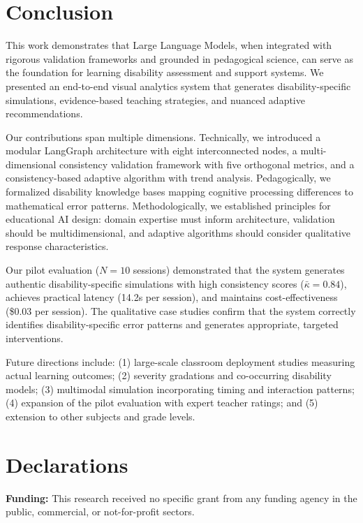 \documentclass[11pt]{article}
\begin{document}
\section{Conclusion}\label{sec:conclusion}

This work demonstrates that Large Language Models, when integrated with rigorous validation frameworks and grounded in pedagogical science, can serve as the foundation for learning disability assessment and support systems. We presented an end-to-end visual analytics system that generates disability-specific simulations, evidence-based teaching strategies, and nuanced adaptive recommendations.

Our contributions span multiple dimensions. Technically, we introduced a modular LangGraph architecture with eight interconnected nodes, a multi-dimensional consistency validation framework with five orthogonal metrics, and a consistency-based adaptive algorithm with trend analysis. Pedagogically, we formalized disability knowledge bases mapping cognitive processing differences to mathematical error patterns. Methodologically, we established principles for educational AI design: domain expertise must inform architecture, validation should be multidimensional, and adaptive algorithms should consider qualitative response characteristics.

Our pilot evaluation ($N=10$ sessions) demonstrated that the system generates authentic disability-specific simulations with high consistency scores ($\bar{\kappa} = 0.84$), achieves practical latency (14.2s per session), and maintains cost-effectiveness (\$0.03 per session). The qualitative case studies confirm that the system correctly identifies disability-specific error patterns and generates appropriate, targeted interventions.

Future directions include: (1) large-scale classroom deployment studies measuring actual learning outcomes; (2) severity gradations and co-occurring disability models; (3) multimodal simulation incorporating timing and interaction patterns; (4) expansion of the pilot evaluation with expert teacher ratings; and (5) extension to other subjects and grade levels.

\section*{Declarations}

\textbf{Funding:} This research received no specific grant from any funding agency in the public, commercial, or not-for-profit sectors.
\end{document}
